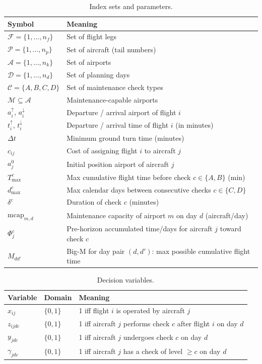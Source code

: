 \documentclass[11pt, a4paper]{article}
\theoremstyle{plain}
\theoremstyle{definition}
\theoremstyle{remark}
\newcommand{\F}{\mathcal{F}}        %
\newcommand{\P}{\mathcal{P}}        %
\newcommand{\A}{\mathcal{A}}        %
\newcommand{\D}{\mathcal{D}}        %
\newcommand{\C}{\mathcal{C}}        %
\newcommand{\MA}{\mathcal{M}}       %
\newcommand{\aI}[1]{a^{\downarrow}_{#1}}        %
\newcommand{\aD}[1]{a^{\uparrow}_{#1}}          %
\newcommand{\tI}[1]{t^{\downarrow}_{#1}}        %
\newcommand{\tD}[1]{t^{\uparrow}_{#1}}          %
\newcommand{\dt}{\Delta t}                       %
\begin{document}
\begin{table}[h]
\centering
\caption{Index sets and parameters.}
\begin{tabular}{ll}
\toprule
Symbol & Meaning \\
\midrule
$\F = \{1,\ldots,n_f\}$  & Set of flight legs \\
$\P = \{1,\ldots,n_p\}$  & Set of aircraft (tail numbers) \\
$\A = \{1,\ldots,n_k\}$  & Set of airports \\
$\D = \{1,\ldots,n_d\}$  & Set of planning days \\
$\C = \{A,B,C,D\}$       & Set of maintenance check types \\
$\MA \subseteq \A$        & Maintenance-capable airports \\
$\aD{i}$, $\aI{i}$       & Departure / arrival airport of flight $i$ \\
$\tD{i}$, $\tI{i}$       & Departure / arrival time of flight $i$ (in minutes) \\
$\dt$                     & Minimum ground turn time (minutes) \\
$c_{ij}$                  & Cost of assigning flight $i$ to aircraft $j$ \\
$a^0_j$                   & Initial position airport of aircraft $j$ \\
$T_{\max}^c$              & Max cumulative flight time before check $c \in \{A,B\}$ (min) \\
$d_{\max}^c$              & Max calendar days between consecutive checks $c \in \{C,D\}$ \\
$\delta^c$                & Duration of check $c$ (minutes) \\
$\text{mcap}_{m,d}$       & Maintenance capacity of airport $m$ on day $d$ (aircraft/day) \\
$\Phi^c_j$                & Pre-horizon accumulated time/days for aircraft $j$ toward check $c$ \\
$M_{dd'}$                 & Big-M for day pair $(d,d')$: max possible cumulative flight time \\
\bottomrule
\end{tabular}
\end{table}

\begin{table}[h]
\centering
\caption{Decision variables.}
\begin{tabular}{lll}
\toprule
Variable & Domain & Meaning \\
\midrule
$x_{ij}$      & $\{0,1\}$ & 1 iff flight $i$ is operated by aircraft $j$ \\
$z_{ijdc}$    & $\{0,1\}$ & 1 iff aircraft $j$ performs check $c$ after flight $i$ on day $d$ \\
$y_{jdc}$     & $\{0,1\}$ & 1 iff aircraft $j$ undergoes check $c$ on day $d$ \\
$\gamma_{jdc}$& $\{0,1\}$ & 1 iff aircraft $j$ has a check of level $\geq c$ on day $d$ \\
\bottomrule
\end{tabular}
\end{table}
\end{document}
